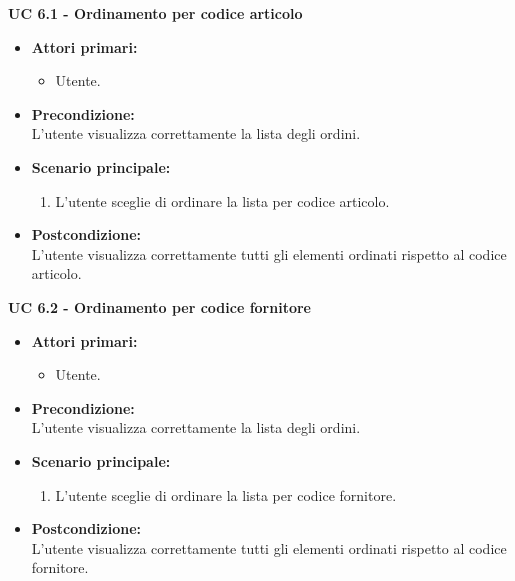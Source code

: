\vspace{0.4cm}

\noindent \textbf{\large UC 6.1 - Ordinamento per codice articolo }
\label{uc:ordinamento-codice-articolo}
\begin{itemize}

	\item \textbf{Attori primari: }
		\begin{itemize}
			\item Utente.
		\end{itemize}

	\item \textbf{Precondizione: }\\[0.3cm]
		L'utente visualizza correttamente la lista degli ordini.
\item \textbf{Scenario principale: }
		\begin{enumerate}
			\item L'utente sceglie di ordinare la lista per codice articolo.
		\end{enumerate}
		

	\item \textbf{Postcondizione: }\\[0.3cm]
		L'utente visualizza correttamente tutti gli elementi ordinati rispetto al codice articolo.

\end{itemize}

\vspace{0.4cm}

\noindent \textbf{\large UC 6.2 - Ordinamento per codice fornitore }
\label{uc:ordinamento-codice-fornitore}
\begin{itemize}

	\item \textbf{Attori primari: }
		\begin{itemize}
			\item Utente.
		\end{itemize}

	\item \textbf{Precondizione: }\\[0.3cm]
		L'utente visualizza correttamente la lista degli ordini.

	\item \textbf{Scenario principale: }
		\begin{enumerate}
			\item L'utente sceglie di ordinare la lista per codice fornitore.
		\end{enumerate}
		

	\item \textbf{Postcondizione: }\\[0.3cm]
		L'utente visualizza correttamente tutti gli elementi ordinati rispetto al codice fornitore.

\end{itemize}

